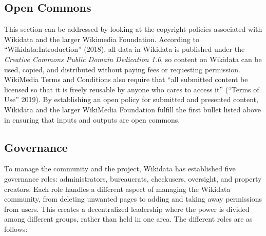 \documentclass[]{article}
\begin{document}
\hypertarget{open-commons}{%
\subsection{Open Commons}\label{open-commons}}

This section can be addressed by looking at the copyright policies
associated with Wikidata and the larger Wikimedia Foundation. According
to ``Wikidata:Introduction'' (2018), all data in Wikidata is published
under the \emph{Creative Commons Public Domain Dedication 1.0}, so
content on Wikidata can be used, copied, and distributed without paying
fees or requesting permission. WikiMedia Terms and Conditions also
require that ``all submitted content be licensed so that it is freely
reusable by anyone who cares to access it'' (``Terms of Use'' 2019). By
establishing an open policy for submitted and presented content,
Wikidata and the larger WikiMedia Foundation fulfill the first bullet
listed above in ensuring that inputs and outputs are open commons.

\hypertarget{governance}{%
\subsection{Governance}\label{governance}}

To manage the community and the project, Wikidata has established five
governance roles: administrators, bureaucrats, checkusers, oversight,
and property creators. Each role handles a different aspect of managing
the Wikidata community, from deleting unwanted pages to adding and
taking away permissions from users. This creates a decentralized
leadership where the power is divided among different groups, rather
than held in one area. The different roles are as follows:
\end{document}
